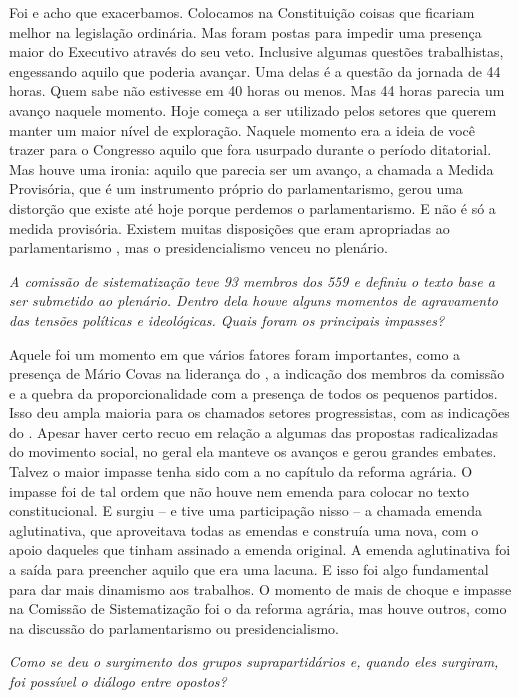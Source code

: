 Foi e acho que exacerbamos. Colocamos na Constituição
coisas que ficariam melhor na legislação ordinária. Mas foram postas
para impedir uma presença maior do Executivo através do seu veto.
Inclusive algumas questões trabalhistas, engessando aquilo que poderia
avançar. Uma delas é a questão da jornada de 44 horas. Quem sabe não
estivesse em 40 horas ou menos. Mas 44 horas parecia um avanço naquele
momento. Hoje começa a ser utilizado pelos setores que querem manter um
maior nível de exploração. Naquele momento era a ideia de você trazer
para o Congresso aquilo que fora usurpado durante o período ditatorial.
Mas houve uma ironia: aquilo que parecia ser um avanço, a chamada a
Medida Provisória, que é um instrumento próprio do parlamentarismo,
gerou uma distorção que existe até hoje porque perdemos o
parlamentarismo. E não é só a medida provisória. Existem muitas
disposições que eram apropriadas ao parlamentarismo , mas o
presidencialismo venceu no plenário.

\medskip

\emph{A comissão de sistematização teve 93 membros dos 559 e definiu o
texto base a ser submetido ao plenário. Dentro dela houve alguns
momentos de agravamento das tensões políticas e ideológicas. Quais foram
os principais impasses?}

Aquele foi um momento em que vários fatores foram
importantes, como a presença de Mário Covas na liderança do , a
indicação dos membros da comissão e a quebra da proporcionalidade com a
presença de todos os pequenos partidos. Isso deu ampla maioria para os
chamados setores progressistas, com as indicações do . Apesar haver
certo recuo em relação a algumas das propostas radicalizadas do
movimento social, no geral ela manteve os avanços e gerou grandes
embates. Talvez o maior impasse tenha sido com a  no capítulo da
reforma agrária. O impasse foi de tal ordem que não houve nem emenda
para colocar no texto constitucional. E surgiu -- e tive uma
participação nisso -- a chamada emenda aglutinativa, que aproveitava
todas as emendas e construía uma nova, com o apoio daqueles que tinham
assinado a emenda original. A emenda aglutinativa foi a saída para
preencher aquilo que era uma lacuna. E isso foi algo fundamental para
dar mais dinamismo aos trabalhos. O momento de mais de choque e impasse
na Comissão de Sistematização foi o da reforma agrária, mas houve
outros, como na discussão do parlamentarismo ou presidencialismo.

\medskip

\emph{Como se deu o surgimento dos grupos suprapartidários e, quando
eles surgiram, foi possível o diálogo entre opostos?}

